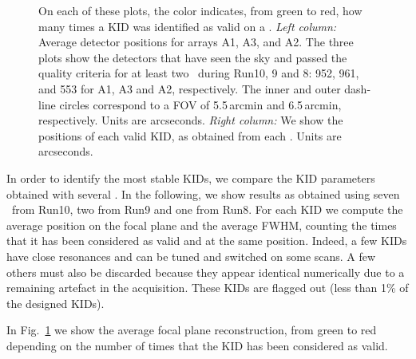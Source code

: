 \begin{figure}[p]
\begin{center}
\caption[KID selection and stability of position in the FOV]{On each of these
  plots, the color indicates, from green to red, how many times a KID was
  identified as valid on a \bm. \emph{Left column:} Average detector positions
  for arrays A1, A3, and A2. The three plots show the detectors that have seen
  the sky and passed the quality criteria for at least two \bms\ during Run10, 9
  and 8: 952, 961, and 553 for A1, A3 and A2, respectively. The inner and outer
  dash-line circles correspond to a FOV of 5.5\,arcmin and 6.5\,arcmin,
  respectively. Units are arcseconds. \emph{Right column:} We show the
  positions of each valid KID, as obtained from each \bm.  Units are arcseconds.}
\label{fig:avg_fov_color}
\end{center}
\end{figure}

In order to identify the most stable KIDs, we compare the KID parameters
obtained with several \bms.  In the following, we show results as obtained using
seven \bms\ from Run10, two from Run9 and one from Run8.  For each KID we
compute the average position on the focal plane and the average FWHM, counting
the times that it has been considered as valid and at the same position. Indeed,
a few KIDs have close resonances and can be tuned and switched on some scans. A
few others must also be discarded because they appear identical numerically due
to a remaining artefact in the acquisition. These KIDs are flagged out (less
than 1\% of the designed KIDs).

In Fig.~\ref{fig:avg_fov_color} we show the
average focal plane reconstruction, from green to red depending on the number of
times that the KID has been considered as valid.

